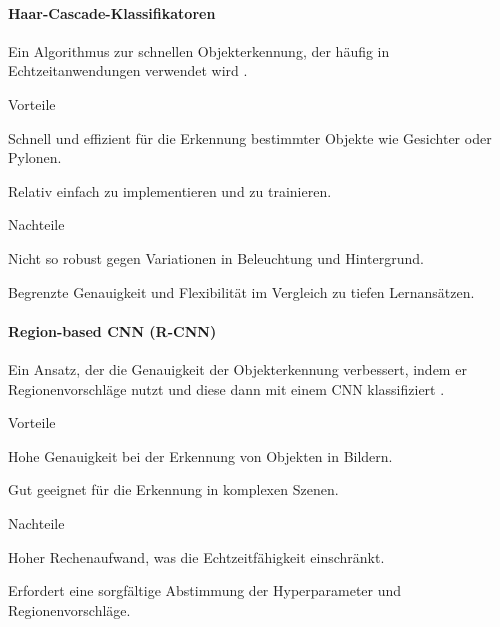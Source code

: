 \documentclass[../main.tex]{subfiles}
\begin{document}
\paragraph{Haar-Cascade-Klassifikatoren}

Ein Algorithmus zur schnellen Objekterkennung, der häufig in Echtzeitanwendungen verwendet wird \cite{haar-cascade}.

\begin{minipage}[t]{0.48\textwidth}
\begin{items}
  \item [Vorteile]
  \item Schnell und effizient für die Erkennung bestimmter Objekte wie Gesichter oder Pylonen.
  \item Relativ einfach zu implementieren und zu trainieren.
\end{items}
\end{minipage}
\hfill
\begin{minipage}[t]{0.48\textwidth}
\begin{items}
  \item [Nachteile]
  \item Nicht so robust gegen Variationen in Beleuchtung und Hintergrund.
  \item Begrenzte Genauigkeit und Flexibilität im Vergleich zu tiefen Lernansätzen.
\end{items}
\end{minipage}

\paragraph{Region-based CNN (R-CNN)}

Ein Ansatz, der die Genauigkeit der Objekterkennung verbessert, indem er Regionenvorschläge nutzt und diese dann mit einem CNN klassifiziert \cite{rcnn_wikipedia}.

\begin{minipage}[t]{0.48\textwidth}
    \begin{items}
      \item [Vorteile]
      \item Hohe Genauigkeit bei der Erkennung von Objekten in Bildern.
      \item Gut geeignet für die Erkennung in komplexen Szenen.
    \end{items}
\end{minipage}
\hfill
\begin{minipage}[t]{0.48\textwidth}
    \begin{items}
      \item [Nachteile]
      \item Hoher Rechenaufwand, was die Echtzeitfähigkeit einschränkt.
      \item Erfordert eine sorgfältige Abstimmung der Hyperparameter und Regionenvorschläge.
    \end{items}
\end{minipage}
\end{document}
